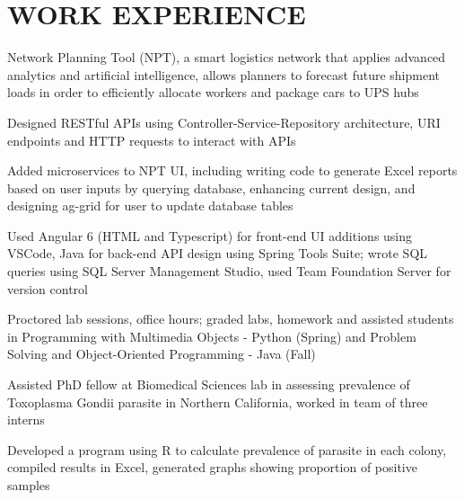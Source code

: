 \documentclass[]{deedy-resume-openfont}
\begin{document}
\hfill
\begin{minipage}[t]{0.67\textwidth} 


\section{WORK EXPERIENCE}

\vspace{\topsep} %
\begin{tightemize}
\item Network Planning Tool (NPT), a smart logistics network that applies advanced analytics and artificial intelligence, allows planners to forecast future shipment loads in order to efficiently allocate workers and package cars to UPS hubs
\item Designed RESTful APIs using Controller-Service-Repository architecture, URI endpoints and HTTP requests to interact with APIs
\item Added microservices to NPT UI, including writing code to generate Excel reports based on user inputs by querying database, enhancing current design, and designing ag-grid for user to update database tables
\item Used Angular 6 (HTML and Typescript) for front-end UI additions using VSCode, Java for back-end API design using Spring Tools Suite; wrote SQL queries using SQL Server Management Studio, used Team Foundation Server for version control
\end{tightemize}
\sectionsep

\begin{tightemize}
\item Proctored lab sessions, office hours; graded labs, homework and assisted students in Programming with Multimedia Objects - Python (Spring) and Problem Solving and Object-Oriented Programming - Java (Fall)
\end{tightemize}
\sectionsep

\begin{tightemize}
\item Assisted PhD fellow at Biomedical Sciences lab in assessing prevalence of Toxoplasma Gondii parasite in Northern California, worked in team of three interns
\item Developed a program using R to calculate prevalence of parasite in each colony, compiled results in Excel, generated graphs showing proportion of positive samples
\end{tightemize}
\sectionsep


\end{minipage}
\end{document}
